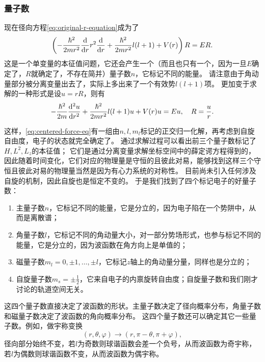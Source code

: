 \subsubsection{量子数}\label{sec:quantum-number}

现在径向方程\eqref{eq:original-r-equation}成为了
\begin{equation}
    \left( - \frac{\hbar^2}{2m r^2} \dv{r} r^2 \dv{r} + \frac{\hbar^2}{2m r^2} l(l+1) + V(r) \right) R = E R.
    \label{eq:r-equation}
\end{equation}
这是一个单变量的本征值问题，它还会产生一个（而且也只有一个，因为一旦$E$确定了，$R$就确定了，不存在简并）量子数$n$，它标记不同的能量。
请注意由于角动量部分被分离变量出去了，实际上多出来了一个有效势$l(l+1)$项。
更加变于求解的一种形式是设$u=rR$，则有
\begin{equation}
    - \frac{\hbar^2}{2m} \dv[2]{u}{r} + \frac{\hbar^2}{2m r^2} l(l+1) u + V(r) u = Eu, \quad R = \frac{u}{r}.
\end{equation}

这样，\eqref{eq:centered-force-eq}有一组由$n, l, m_l$标记的正交归一化解，再考虑到自旋自由度，电子的状态就完全确定了。
通过求解过程可以看出前三个量子数标记了${H}, {L}^2, {L}_z$的本征值；
它们是通过分离变量求解坐标空间中的薛定谔方程得到的，因此随着时间变化，它们对应的物理量是守恒的且彼此对易，能够找到这样三个守恒且彼此对易的物理量当然是因为有心力系统的对称性。
目前尚未引入任何涉及自旋的机制，因此自旋也是恒定不变的。
于是我们找到了四个标记电子的好量子数：
\begin{enumerate}
    \item 主量子数$n$，它标记不同的能量，它是分立的，因为电子陷在一个势阱中，从而是离散谱；
    \item 角量子数$l$，它标记不同的角动量大小，对一部分势场形式，也参与标记不同的能量，它是分立的，因为波函数在角方向上是单值的；
    \item 磁量子数$m_l = 0, \pm 1, \ldots, \pm l$，它标记$z$轴上的角动量分量，同样也是分立的；
    \item 自旋量子数$m_s = \pm \frac{1}{2}$，它来自电子的内禀旋转自由度；自旋量子数和我们刚才讨论的轨道空间无关。
\end{enumerate}

这四个量子数直接决定了波函数的形状。主量子数决定了径向概率分布，角量子数和磁量子数决定了波函数的角向概率分布。
这四个量子数还可以确定其它一些量子数。例如，做宇称变换
\[
    (r, \theta, \varphi) \longrightarrow (r, \pi - \theta, \pi + \varphi),
\]
径向部分始终不变，若$l$为奇数则球谐函数会差一个负号，从而波函数为奇宇称，若$l$为偶数则球谐函数不变，从而波函数为偶宇称。

